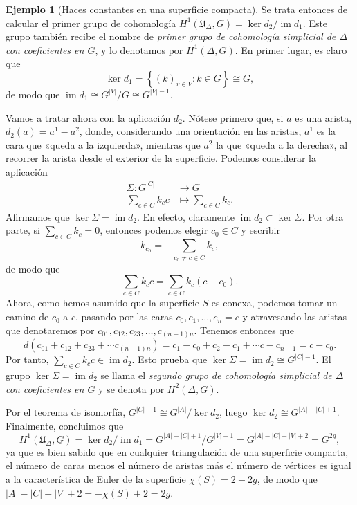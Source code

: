 \documentclass[12pt,a4paper]{article}
\theoremstyle{definition} \newtheorem{defn}[thm]{Definición}
\theoremstyle{definition} \newtheorem{ejemplo}[thm]{Ejemplo}
\theoremstyle{definition} \newtheorem{ejercicio}[thm]{Ejercicio}
\def\UU{\mathfrak{U}}
\DeclareMathOperator{\im}{im}
\begin{document}
\begin{ejemplo}[Haces constantes en una superficie compacta]
    Se trata entonces de calcular el primer grupo de cohomología $H^1(\UU_{\Delta},\underline{G})= \ker d_2 / \im d_1$. Este grupo también recibe el nombre de \emph{primer grupo de cohomología simplicial de $\Delta$ con coeficientes en $G$}, y lo denotamos por $H^1(\Delta,G)$. En primer lugar, es claro que
    \begin{equation*}
      \ker d_1 = \left\{ (k)_{v\in V}: k \in G \right\} \cong G,
    \end{equation*}
    de modo que $\im d_1 \cong G^{|V|}/G \cong G^{|V|-1}$.

    Vamos a tratar ahora con la aplicación $d_2$. Nótese primero que, si $a$ es una arista, $d_2(a) = a^1 - a^2$, donde, considerando una orientación en las aristas, $a^1$ es la cara que «queda a la izquierda», mientras que $a^2$ la que «queda a la derecha», al recorrer la arista desde el exterior de la superficie. Podemos considerar la aplicación
    \begin{align*}
      \Sigma : G^{|C|}&\longrightarrow G\\ 
      \sum_{c\in C} k_c c &\longmapsto \sum_{c\in C} k_c. 
      \end{align*}
      Afirmamos que $\ker \Sigma = \im d_2$. En efecto, claramente $\im d_2 \subset \ker \Sigma$. Por otra parte, si $\sum_{c \in C} k_c=0$, entonces podemos elegir $c_0 \in C$ y escribir
      \begin{equation*}
	k_{c_0} = -\sum_{c_0 \neq c \in C} k_c,
      \end{equation*}
      de modo que
      \begin{equation*}
	\sum_{c \in C} k_c c = \sum_{c \in C} k_c (c-c_0).
      \end{equation*}
      Ahora, como hemos asumido que la superficie $S$ es conexa, podemos tomar un camino de $c_0$ a $c$, pasando por las caras $c_0,c_1,\dots,c_n=c$ y atravesando las aristas que denotaremos por $c_{01}, c_{12}, c_{23},\dots,c_{(n-1) n}$. Tenemos entonces que
      \begin{equation*}
	d(c_{01}+c_{12}+c_{23}+\cdots c_{(n-1) n} ) = c_1 - c_0 + c_2 - c_1 + \cdots c - c_{n-1} = c-c_0.
      \end{equation*}
      Por tanto, $\sum_{c\in C} k_c c \in \im d_2$.
      Esto prueba que $\ker \Sigma = \im d_2 \cong G^{|C|-1}$. El grupo $\ker \Sigma = \im d_2$ se llama el \emph{segundo grupo de cohomología simplicial de $\Delta$ con coeficientes en $G$} y se denota por $H^2(\Delta,G)$.
    
    Por el teorema de isomorfía, $G^{|C|-1} \cong G^{|A|}/\ker d_2$, luego $\ker d_2 \cong G^{|A|-|C|+1}$. Finalmente, concluimos que
    \begin{equation*}
      H^1(\UU_{\Delta},\underline{G}) = \ker d_2 / \im d_1 = G^{|A|-|C|+1}/G^{|V|-1} = G^{|A|-|C|-|V|+2} = G^{2g},
    \end{equation*}
    ya que es bien sabido que en cualquier triangulación de una superficie compacta, el número de caras menos el número de aristas más el número de vértices es igual a la característica de Euler de la superficie $\chi(S)=2-2g$, de modo que $|A|-|C|-|V|+2= -\chi(S) +2 = 2g$.


\end{ejemplo}
\end{document}
